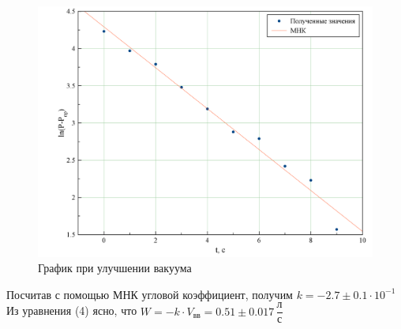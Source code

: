 \documentclass{letnab}
\begin{document}
\begin{figure}[H]
	\includegraphics[width=150mm]{Graph1.png}
	\caption{График при улучшении вакуума}
\end{figure}
Посчитав с помощью МНК угловой коэффициент, получим $k = -2.7\pm0.1\cdot 10^{-1}$\\
Из уравнения (4) ясно, что $W = -k \cdot V_\text{вв} = 0.51 \pm 0.017 \,\dfrac{\text{л}}{\text{с}}$
\end{document}
